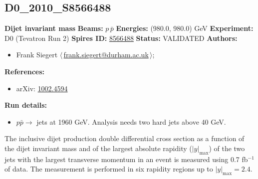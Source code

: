 \subsection[D0\_2010\_S8566488]{D0\_2010\_S8566488\,\cite{Abazov:2010fr}}
\textbf{Dijet invariant mass}\newline
\textbf{Beams:} $p$\,$\bar{p}$ \newline
\textbf{Energies:} (980.0, 980.0) GeV \newline
\textbf{Experiment:} D0 (Tevatron Run 2) \newline
\textbf{Spires ID:} \href{http://www.slac.stanford.edu/spires/find/hep/www?rawcmd=key+8566488}{8566488}\newline
\textbf{Status:} VALIDATED\newline
\textbf{Authors:}
\begin{itemize}
  \item Frank Siegert $\langle\,$\href{mailto:frank.siegert@durham.ac.uk}{frank.siegert@durham.ac.uk}$\,\rangle$;
\end{itemize}
\textbf{References:}
\begin{itemize}
  \item arXiv: \href{http://arxiv.org/abs/1002.4594}{1002.4594}
\end{itemize}
\textbf{Run details:}
\begin{itemize}

  \item $p \bar{p} \to$ jets at 1960 GeV. Analysis needs two hard jets above 40 GeV.\end{itemize}

\noindent The inclusive dijet production double differential cross section as a function of the dijet invariant mass and of the largest absolute rapidity ($|y|_\text{max}$) of the two jets with the largest transverse momentum in an event is measured using 0.7 fb$^{-1}$ of data. The measurement is performed in six rapidity regions up to $|y|_\text{max}=2.4$.

\clearpage


\clearpage

